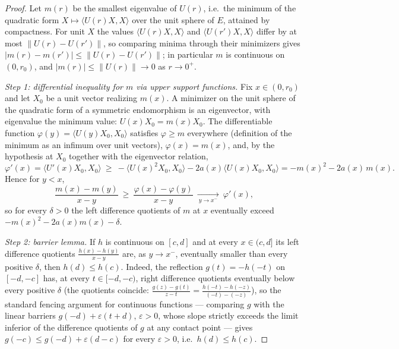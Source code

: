 \begin{proof}
\leanok
Let $m(r)$ be the smallest eigenvalue of $U(r)$, i.e.\ the minimum
of the quadratic form $X\mapsto\langle U(r)X,X\rangle$ over the
unit sphere of $E$, attained by compactness. For unit $X$ the
values $\langle U(r)X,X\rangle$ and $\langle U(r')X,X\rangle$
differ by at most $\|U(r)-U(r')\|$, so comparing minima through
their minimizers gives $|m(r)-m(r')|\le\|U(r)-U(r')\|$; in
particular $m$ is continuous on $(0,r_0)$, and
$|m(r)|\le\|U(r)\|\to0$ as $r\to0^+$.

\emph{Step 1: differential inequality for $m$ via upper support
functions.} Fix $x\in(0,r_0)$ and let $X_0$ be a unit vector
realizing $m(x)$. A minimizer on the unit sphere of the quadratic
form of a symmetric endomorphism is an eigenvector, with eigenvalue
the minimum value: $U(x)X_0=m(x)X_0$. The differentiable function
$\varphi(y)=\langle U(y)X_0,X_0\rangle$ satisfies $\varphi\ge m$
everywhere (definition of the minimum as an infimum over unit
vectors), $\varphi(x)=m(x)$, and, by the hypothesis at $X_0$
together with the eigenvector relation,
$$\varphi'(x)=\langle U'(x)X_0,X_0\rangle\ \ge\
-\langle U(x)^2X_0,X_0\rangle-2a(x)\langle U(x)X_0,X_0\rangle
=-m(x)^2-2a(x)\,m(x).$$
Hence for $y<x$,
$$\frac{m(x)-m(y)}{x-y}\ \ge\ \frac{\varphi(x)-\varphi(y)}{x-y}
\ \xrightarrow[\ y\to x^-\ ]{}\ \varphi'(x),$$
so for every $\delta>0$ the left difference quotients of $m$ at
$x$ eventually exceed $-m(x)^2-2a(x)m(x)-\delta$.

\emph{Step 2: barrier lemma.} If $h$ is continuous on $[c,d]$ and
at every $x\in(c,d]$ its left difference quotients
$\frac{h(x)-h(y)}{x-y}$ are, as $y\to x^-$, eventually smaller
than every positive $\delta$, then $h(d)\le h(c)$. Indeed, the
reflection $g(t)=-h(-t)$ on $[-d,-c]$ has, at every
$t\in[-d,-c)$, right difference quotients eventually below every
positive $\delta$ (the quotients coincide:
$\frac{g(z)-g(t)}{z-t}=\frac{h(-t)-h(-z)}{(-t)-(-z)}$), so the
standard fencing argument for continuous functions — comparing $g$
with the linear barriers $g(-d)+\varepsilon(t+d)$, $\varepsilon>0$,
whose slope strictly exceeds the limit inferior of the difference
quotients of $g$ at any contact point — gives
$g(-c)\le g(-d)+\varepsilon(d-c)$ for every $\varepsilon>0$, i.e.\
$h(d)\le h(c)$.


\end{proof}
